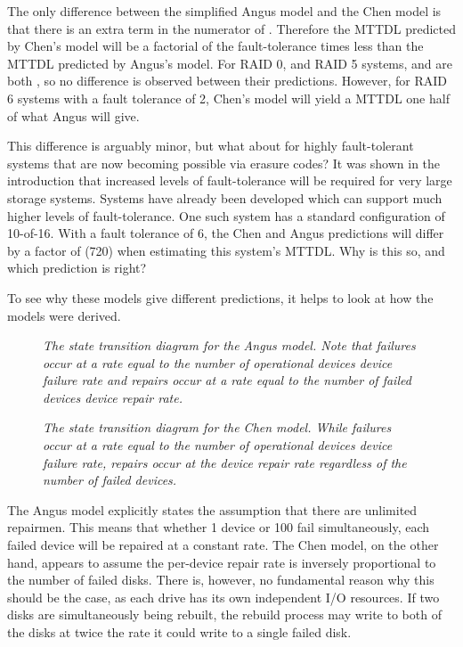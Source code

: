 \documentclass[XXX,endnotes]{usetex-v1}
\begin{document}
The only difference between the simplified Angus model and the Chen model is that there is an extra term in the numerator of .  Therefore the MTTDL predicted by Chen's model will be a factorial of the fault-tolerance times less than the MTTDL predicted by Angus's model.  For RAID 0, and RAID 5 systems,  and  are both , so no difference is observed between their predictions.  However, for RAID 6 systems with a fault tolerance of 2, Chen's model will yield a MTTDL one half of what Angus will give.

This difference is arguably minor, but what about for highly fault-tolerant systems that are now becoming possible via erasure codes?  It was shown in the introduction that increased levels of fault-tolerance will be required for very large storage systems.  Systems have already been developed\cite{oceanstore, tahoe, wuala} which can support much higher levels of fault-tolerance.  One such system has a standard configuration of 10-of-16.  With a fault tolerance of 6, the Chen and Angus predictions will differ by a factor of  (720) when estimating this system's MTTDL.  Why is this so, and which prediction is right?

To see why these models give different predictions, it helps to look at how the models were derived.  


\begin{figure}[htbp]
\begin{centering}
\small\itshape
\caption{\small\itshape The state transition diagram for the Angus model.  Note that failures occur at a rate equal to the number of operational devices  device failure rate and repairs occur at a rate equal to the number of failed devices  device repair rate.}
\label{fig-sample}
\end{centering}
\end{figure}

\begin{figure}[htbp]
\begin{centering}
\small\itshape
\caption{\small\itshape The state transition diagram for the Chen model.  While failures occur at a rate equal to the number of operational devices  device failure rate, repairs occur at the device repair rate regardless of the number of failed devices.}
\label{fig-sample}
\end{centering}
\end{figure}

The Angus model explicitly states the assumption that there are unlimited repairmen.  This means that whether 1 device or 100 fail simultaneously, each failed device will be repaired at a constant rate.  The Chen model, on the other hand, appears to assume the per-device repair rate is inversely proportional to the number of failed disks.  There is, however, no fundamental reason why this should be the case, as each drive has its own independent I/O resources.  If two disks are simultaneously being rebuilt, the rebuild process may write to both of the disks at twice the rate it could write to a single failed disk.
\end{document}
